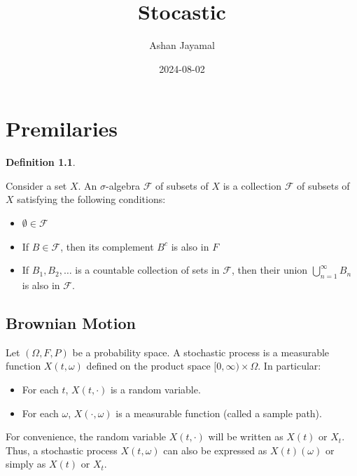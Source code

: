 \documentclass[
]{book}
\title{Stocastic}
\author{Ashan Jayamal}
\date{2024-08-02}
\providecommand{\tightlist}{%
  \setlength{\itemsep}{0pt}\setlength{\parskip}{0pt}}
\theoremstyle{definition}
\newtheorem{definition}{Definition}[chapter]
\theoremstyle{definition}
\theoremstyle{definition}
\theoremstyle{definition}
\theoremstyle{remark}
\begin{document}
\maketitle

{
\setcounter{tocdepth}{1}
\tableofcontents
}
\chapter{Premilaries}\label{premilaries}

\begin{definition}
\protect\hypertarget{def:unnamed-chunk-1}{}\label{def:unnamed-chunk-1}

Consider a set \(X\).
An \(\sigma\)-algebra \(\mathcal{F}\) of subsets of \(X\) is a collection \(\mathcal{F}\) of subsets of \(X\) satisfying the following conditions:

\begin{itemize}
\tightlist
\item
  \(\emptyset \in \mathcal{F}\)
\item
  If \(B \in \mathcal{F}\), then its complement \(B^c\) is also in \(F\)
\item
  If \(B_1, B_2, \ldots\) is a countable collection of sets in \(\mathcal{F}\), then their union \(\bigcup_{n=1}^\infty B_n\) is also in \(\mathcal{F}\).
\end{itemize}

\end{definition}

\section{Brownian Motion}\label{brownian-motion}

Let \((\Omega, F, P)\) be a probability space. A stochastic process is a measurable function \(X(t, \omega)\) defined on the product space \([0,\infty) \times \Omega\). In particular:

\begin{itemize}
\tightlist
\item
  For each \(t\), \(X(t, \cdot)\) is a random variable.
\item
  For each \(\omega\), \(X(\cdot, \omega)\) is a measurable function (called a sample path).
\end{itemize}

For convenience, the random variable \(X(t, \cdot)\) will be written as \(X(t)\) or \(X_t\).
Thus, a stochastic process \(X(t, \omega)\) can also be expressed as \(X(t)(\omega)\) or simply as \(X(t)\) or \(X_t\).
\end{document}
